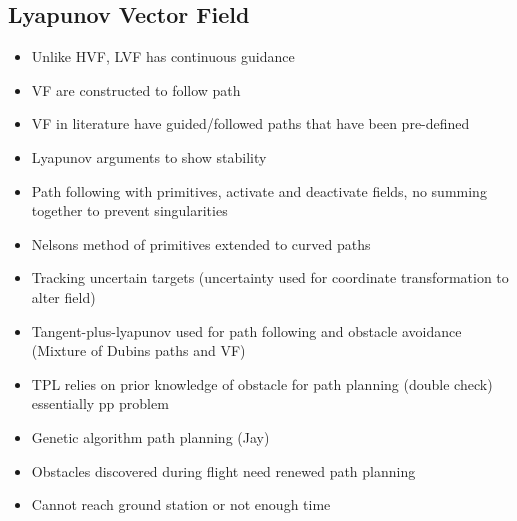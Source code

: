 \documentclass[numbered,pdftex]{ohio-etd}
\begin{document}
\subsection{Lyapunov Vector Field}
\begin{itemize}
	\item Unlike HVF, LVF has continuous guidance
	\item VF are constructed to follow path
	\item VF in literature have guided/followed paths that have been pre-defined
	\item Lyapunov arguments to show stability
	\item Path following with primitives, activate and deactivate fields, no summing together to prevent singularities
	\item Nelsons method of primitives extended to curved paths
	\item Tracking uncertain targets (uncertainty used for coordinate transformation to alter field)
	\item Tangent-plus-lyapunov used for path following and obstacle avoidance (Mixture of Dubins paths and VF)
	\item TPL relies on prior knowledge of obstacle for path planning (double check) essentially pp problem 
	\item Genetic algorithm path planning (Jay)
	\item Obstacles discovered during flight need renewed path planning
	\item Cannot reach ground station or not enough time


\end{itemize}
\end{document}
